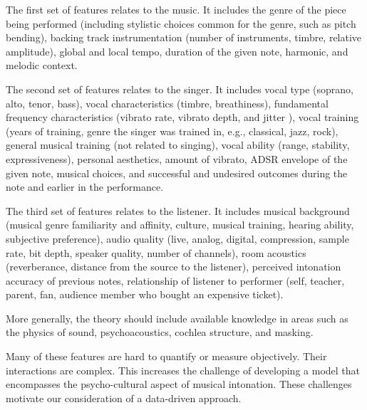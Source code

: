 The first set of features relates to the music. It includes the genre of the piece being performed (including stylistic choices common for the genre, such as pitch bending), backing track instrumentation (number of instruments, timbre, relative amplitude), global and local tempo, duration of the given note, harmonic, and melodic context.

The second set of features relates to the singer. It includes vocal type (soprano, alto, tenor, bass), vocal characteristics (timbre, breathiness), fundamental frequency characteristics (vibrato rate, vibrato depth, and jitter \cite{devaney2020new}), vocal training (years of training, genre the singer was trained in, e.g., classical, jazz, rock), general musical training (not related to singing), vocal ability (range, stability, expressiveness), personal aesthetics, amount of vibrato, ADSR envelope of the given note, musical choices, and successful and undesired outcomes during the note and earlier in the performance.

The third set of features relates to the listener. It includes musical background (musical genre familiarity and affinity, culture, musical training, hearing ability, subjective preference), audio quality (live, analog, digital, compression, sample rate, bit depth, speaker quality, number of channels), room acoustics (reverberance, distance from the source to the listener), perceived intonation accuracy of previous notes, relationship of listener to performer (self, teacher, parent, fan, audience member who bought an expensive ticket).

More generally, the theory should include available knowledge in areas such as the physics of sound, psychoacoustics, cochlea structure, and masking.

Many of these features are hard to quantify or measure objectively. Their interactions are complex. This increases the challenge of developing a model that encompasses the psycho-cultural aspect of musical intonation. These challenges motivate our consideration of a data-driven approach.


